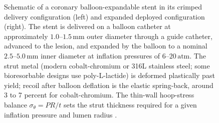 \begin{figure}[htbp]
\caption[Coronary stent geometry and expansion]{Schematic of a
coronary balloon-expandable stent in its crimped delivery
configuration (left) and expanded deployed configuration (right).
The stent is delivered on a balloon catheter at approximately
$1.0\text{--}1.5\,\text{mm}$ outer diameter through a guide
catheter, advanced to the lesion, and expanded by the balloon to a
nominal $2.5\text{--}5.0\,\text{mm}$ inner diameter at inflation
pressures of $6\text{--}20\,\text{atm}$. The strut metal (modern
cobalt-chromium or 316L stainless steel; some bioresorbable
designs use poly-L-lactide) is deformed plastically past yield;
recoil after balloon deflation is the elastic spring-back, around
3 to 7 percent for cobalt-chromium. The thin-wall hoop-stress
balance $\sigma_\theta = PR/t$ sets the strut thickness required
for a given inflation pressure and lumen radius
\cite{paper:v6c12-stone-des-2010,
text:v6c12-ratner-biomaterials-2020}.}
\label{fig:vol06:ch12:stent-geometry}
\end{figure}

